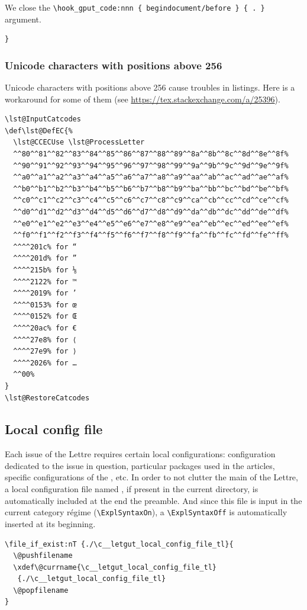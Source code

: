 \documentclass{letgut}
\begin{document}
We close the \lstinline+\hook_gput_code:nnn { begindocument/before } { . }+ argument.

\begin{lstlisting}
}
\end{lstlisting}
\subsubsection{Unicode characters with positions above 256}
\label{ImplementationListingsUnicodecharacterswithpositionsabove256-4l6h55h0jlj0}
Unicode characters with positions above 256 cause troubles in
listings. Here is a workaround for some of them (see
\url{https://tex.stackexchange.com/a/25396}).

\begin{lstlisting}
\lst@InputCatcodes
\def\lst@DefEC{%
  \lst@CCECUse \lst@ProcessLetter
  ^^80^^81^^82^^83^^84^^85^^86^^87^^88^^89^^8a^^8b^^8c^^8d^^8e^^8f%
  ^^90^^91^^92^^93^^94^^95^^96^^97^^98^^99^^9a^^9b^^9c^^9d^^9e^^9f%
  ^^a0^^a1^^a2^^a3^^a4^^a5^^a6^^a7^^a8^^a9^^aa^^ab^^ac^^ad^^ae^^af%
  ^^b0^^b1^^b2^^b3^^b4^^b5^^b6^^b7^^b8^^b9^^ba^^bb^^bc^^bd^^be^^bf%
  ^^c0^^c1^^c2^^c3^^c4^^c5^^c6^^c7^^c8^^c9^^ca^^cb^^cc^^cd^^ce^^cf%
  ^^d0^^d1^^d2^^d3^^d4^^d5^^d6^^d7^^d8^^d9^^da^^db^^dc^^dd^^de^^df%
  ^^e0^^e1^^e2^^e3^^e4^^e5^^e6^^e7^^e8^^e9^^ea^^eb^^ec^^ed^^ee^^ef%
  ^^f0^^f1^^f2^^f3^^f4^^f5^^f6^^f7^^f8^^f9^^fa^^fb^^fc^^fd^^fe^^ff%
  ^^^^201c% for “
  ^^^^201d% for ”
  ^^^^215b% for ⅛
  ^^^^2122% for ™
  ^^^^2019% for ’
  ^^^^0153% for œ
  ^^^^0152% for Œ
  ^^^^20ac% for €
  ^^^^27e8% for ⟨
  ^^^^27e9% for ⟩
  ^^^^2026% for …
  ^^00%
}
\lst@RestoreCatcodes
\end{lstlisting}
\subsection{Local config file}
\label{ImplementationLocalconfigfile-me7h55h0jlj0}
Each issue of the Lettre requires certain local configurations: configuration
dedicated to the issue in question, particular packages used in the articles,
specific configurations of the , etc. In order to not clutter
the main  of the Lettre, a local configuration file named
, if present in the current directory, is automatically
included at the end the preamble. And since this file is input in the current
category régime (\lstinline+\ExplSyntaxOn+), a \lstinline+\ExplSyntaxOff+ is automatically inserted
at its beginning.

\begin{lstlisting}
\file_if_exist:nT {./\c__letgut_local_config_file_tl}{
  \@pushfilename
  \xdef\@currname{\c__letgut_local_config_file_tl}
   {./\c__letgut_local_config_file_tl}
  \@popfilename
}
\end{lstlisting}
\end{document}
